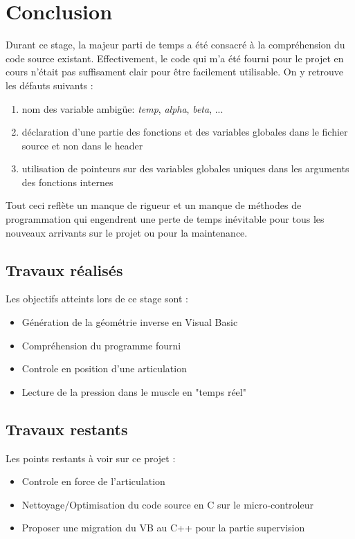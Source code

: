\newpage
\section{Conclusion}
\label{sec:conlusion}

Durant ce stage, la majeur parti de temps a \'et\'e consacr\'e \`a la compr\'ehension du code source existant.
Effectivement, le code qui m'a \'et\'e fourni pour le projet en cours n'\'etait pas suffisament clair pour \^etre facilement utilisable.
On y retrouve les d\'efauts suivants :
\begin{enumerate}
\item nom des variable ambig\"ue: \emph{temp}, \emph{alpha}, \emph{beta}, ...
\item d\'eclaration d'une partie des fonctions et des variables globales dans le fichier source et non dans le header
\item utilisation de pointeurs sur des variables globales uniques dans les arguments des fonctions internes
\end{enumerate}
Tout ceci refl\`ete un manque de rigueur et un manque de m\'ethodes de programmation qui engendrent une perte de temps in\'evitable pour tous les nouveaux arrivants sur le projet ou pour la maintenance.

\subsection{Travaux réalisés}
\label{sub:travauxrealises}
Les objectifs atteints lors de ce stage sont :
\begin{itemize}
\item G\'en\'eration de la g\'eom\'etrie inverse en Visual Basic
\item Compr\'ehension du programme fourni
\item Controle en position d'une articulation
\item Lecture de la pression dans le muscle en "temps r\'eel"
\end{itemize}

\subsection{Travaux restants}
\label{sub:travauxrestant}
Les points restants \`a voir sur ce projet :
\begin{itemize}
\item Controle en force de l'articulation
\item Nettoyage/Optimisation du code source en C sur le micro-controleur
\item Proposer une migration du VB au C++ pour la partie supervision
\end{itemize}

